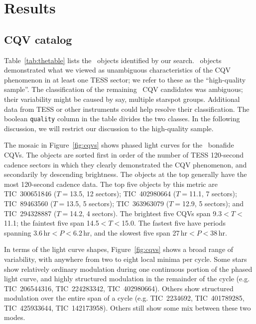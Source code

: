 \documentclass[11pt,twocolumn,tighten]{aastex63}
\begin{document}
\section{Results}
\label{sec:results}

\subsection{CQV catalog}
\label{sec:catalog}

Table~\ref{tab:thetable} lists the \ncpvsfound\ objects identified by
our search.  \ngoods\ objects demonstrated what we viewed as
unambiguous characteristics of the CQV phenomenon in at least one TESS
sector; we refer to these as the ``high-quality sample''.  The
classification of the remaining \nmaybes\ CQV candidates was ambiguous; their variability
might be caused by say, multiple starspot groups.  Additional data
from TESS or other instruments could help resolve their
classification.  The boolean \texttt{quality} column in the table divides
the two classes.  In the following discussion, we will restrict our
discussion to the high-quality sample.

The mosaic in Figure~\ref{fig:cqvs} shows phased light curves for the
\ngoods\ bonafide CQVs.  The objects are sorted first in order of the
number of TESS 120-second cadence sectors in which they clearly
demonstrated the CQV phenomenon, and secondarily by descending
brightness.  The objects at the top generally have the most 120-second
cadence data.  The top five objects by this metric are TIC~300651846
($T$$=$13.5, 12 sectors); TIC~402980664 ($T$$=$11.1, 7 sectors);
TIC~89463560 ($T$$=$13.5, 5 sectors); TIC~363963079 ($T$$=$12.9, 5
sectors); and TIC~294328887 ($T$$=$14.2, 4 sectors).  The brightest
five CQVs span 9.3$<$$T$$<$11.1; the faintest five span
14.5$<$$T$$<$15.0.  The fastest five have periods spanning
3.6\,hr$<$$P$$<$6.2\,hr, and the slowest five span
27\,hr$<$$P$$<$38\,hr.

In terms of the light curve shapes, Figure~\ref{fig:cqvs} shows a
broad range of variability, with anywhere from two to eight local
minima per cycle.  Some stars show relatively ordinary modulation
during one continuous portion of the phased light curve, and highly
structured modulation in the remainder of the cycle (e.g.
TIC~206544316, TIC~224283342, TIC~402980664).  Others show structured
modulation over the entire span of a cycle (e.g. TIC~2234692,
TIC~401789285, TIC~425933644, TIC~142173958).  Others still show some
mix between these two modes.
\end{document}

